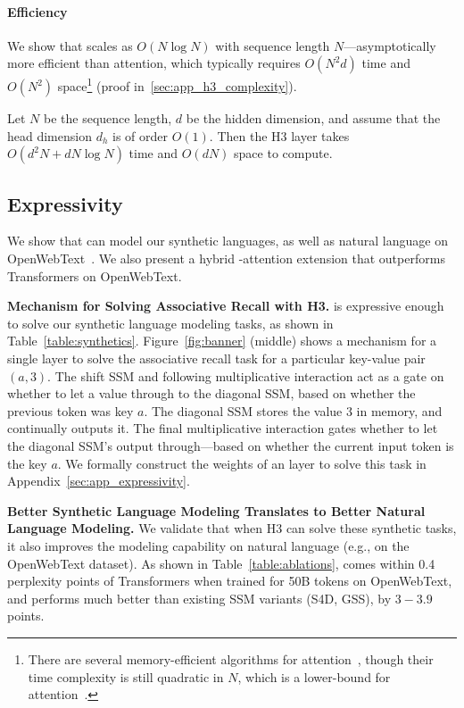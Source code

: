 \paragraph{Efficiency}
We show that \hthree scales as $O(N \log N)$ with
sequence length $N$---asymptotically more efficient than attention, which typically requires $O(N^2d)$ time and $O(N^2)$ space\footnote{There are several memory-efficient
algorithms for attention~\citep{rabe2021self,dao2022flashattention}, though
their time complexity is still quadratic in $N$, which is a lower-bound for attention~\citep{keles2022computational}.} (proof in~\cref{sec:app_h3_complexity}).
\begin{proposition}\label{thm:h3_complexity}
  Let $N$ be the sequence length, $d$ be the hidden dimension, and assume that
  the head dimension $d_h$ is of order $O(1)$.
  Then the H3 layer takes $O(d^2N + d N \log N)$ time and $O(dN)$ space to compute.
\end{proposition}


\subsection{Expressivity}
\label{sec:expressivity}

We show that \hthree can model our synthetic languages, as well as natural language on OpenWebText~\citep{Gokaslan2019OpenWeb}.
We also present a hybrid \hthree-attention extension that outperforms Transformers on OpenWebText.

\textbf{Mechanism for Solving Associative Recall with H3.}
\hthree is expressive enough to solve our synthetic language modeling tasks, as shown in Table~\ref{table:synthetics}.
Figure~\ref{fig:banner} (middle) shows a mechanism for a single \hthree layer to solve the associative recall task for a particular key-value pair $(a, 3)$.
The shift SSM and following multiplicative interaction act as a gate on whether to let a value through to the diagonal SSM, based on whether the previous token was key $a$.
The diagonal SSM stores the value $3$ in memory, and continually outputs it.
The final multiplicative interaction gates whether to let the diagonal SSM's output through---based on whether the current input token is the key $a$.
We formally construct the weights of an \hthree layer to solve this task in Appendix~\ref{sec:app_expressivity}.



\textbf{Better Synthetic Language Modeling Translates to Better Natural Language Modeling.}
We validate that when H3 can solve these synthetic tasks, it also improves the modeling capability on natural language (e.g., on the OpenWebText dataset).
As shown in Table~\ref{table:ablations}, \hthree comes within 0.4 perplexity points of Transformers when trained for 50B tokens on OpenWebText, and performs much better than existing SSM variants (S4D, GSS), by $3-3.9$ points.

